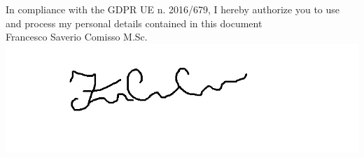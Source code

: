 \documentclass[10pt,a4paper,ragged2e,withhyper]{altacv}
\begin{document}
\begin{paracol}{2}

\divider

\divider


\medskip









{}


\switchcolumn
\newpage


In compliance with the GDPR UE n. 2016/679, 
I hereby authorize you to use and process my personal details contained in this document
\\

Francesco Saverio Comisso M.Sc.
\includegraphics[height=4\baselineskip]{Firma.jpg}






\end{paracol}
\end{document}
